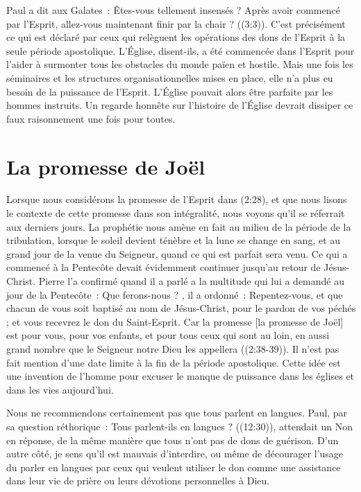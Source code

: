 Paul a dit aux Galates~: \og Êtes-vous tellement insensés ?
 Après avoir commencé par l'Esprit, allez-vous maintenant finir
 par la chair ? \fg{} ((3:3)).
 C'est précisément ce qui est déclaré par ceux qui relèguent
 les opérations des dons de l'Esprit à la seule période apostolique.
 L'Église, disent-ils, a été commencée dans l'Esprit pour l'aider
 à surmonter tous les obstacles du monde païen et hostile.
 Mais une fois les séminaires et les structures organisationnelles
 mises en place, elle n'a plus eu besoin de la puissance de l'Esprit.
 L'Église pouvait alors être parfaite par les hommes instruits.
 Un regarde honnête sur l'histoire de l'Église devrait dissiper
 ce faux raisonnement une fois pour toutes.


\section*{La promesse de Joël}

Lorsque nous considérons la promesse de l'Esprit dans (2:28),
 et que nous lisons le contexte de cette promesse dans son intégralité,
 nous voyons qu'il se réferrait aux derniers jours.
 La prophétie nous amène en fait au milieu de la période de la tribulation,
 lorsque le soleil devient ténèbre et la lune se change en sang,
 et au grand jour de la venue du Seigneur, quand ce qui est parfait sera venu.
 Ce qui a commencé à la Pentecôte devait évidemment continuer jusqu'au retour
 de Jésus-Christ. Pierre l'a confirmé quand il a parlé a la multitude
 qui lui a demandé au jour de la Pentecôte~: \og Que ferons-nous ? \fg{},
 il a ordonné~: \og Repentez-vous, et que chacun de vous soit baptisé
 au nom de Jésus-Christ, pour le pardon de vos péchés ;
 et vous recevrez le don du Saint-Esprit. Car la promesse
 [la promesse de Joël] est pour vous, pour vos enfants,
 et pour tous ceux qui sont au loin, en aussi grand nombre
 que le Seigneur notre Dieu les appellera \fg{} ((2:38-39)).
 Il n'est pas fait mention d'une date limite à la fin de la période
 apostolique. Cette idée est une invention de l'homme pour excuser
 le manque de puissance dans les églises et dans les vies aujourd'hui.

Nous ne recommendons certainement pas que tous parlent en langues.
 Paul, par sa question réthorique~: \og Tous parlent-ils en langues ? \fg{}
 ((12:30)), attendait un \og Non \fg{} en réponse,
 de la même manière que tous n'ont pas de dons de guérison.
 D'un autre côté, je sens qu'il est mauvais d'interdire,
 ou même de décourager l'usage du parler en langues par ceux
 qui veulent utiliser le don comme une assistance dans leur vie
 de prière ou leurs dévotions personnelles à Dieu.
\closechapter


